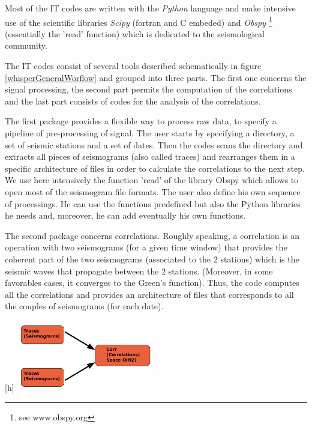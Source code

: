 \documentclass[a4paper, 10pt]{article}
\begin{document}
\begin{multicols}{2}
Most of the IT codes are written with the \emph{Python} language and make intensive use of the scientific libraries \emph{Scipy} (fortran and C embeded) 
and \emph{Obspy} \footnote{ see www.obspy.org} (essentially the 'read' function) which is dedicated to the seismological community. 

The IT codes consist of several tools described schematically in figure \ref{whisperGeneralWorflow} and grouped into three parts. The first one concerns the signal processing, the second part permits the computation of the correlations and the last part consists of codes for the analysis of the correlations.

The first package provides a flexible way to process raw data, to specify a pipeline of pre-processing of signal.
The user starts by specifying a directory, a set of seismic stations and a set of dates. Then the codes scans the directory
and extracts all pieces of seismograms (also called traces) and rearranges them in a specific architecture of files in order to calculate the correlations to the next step.
We use here intensively the function 'read' of the library Obspy which allows to open most of the seismogram file formats.
The user also define his own sequence of processings. He can use the functions predefined but also the Python libraries he needs and,
moreover, he can add eventually his own functions.

The second package concerns correlations. 
Roughly speaking, a correlation is an operation with two seismograms (for a given time window) that provides the coherent part of the two seismograms 
(associated to the 2 stations) which is the seismic waves that propagate between the 2 stations.
(Moreover, in some favorables cases, it converges to the Green's function). 
Thus, the code computes all the correlations and provides an architecture of files that corresponds to all the couples of seismograms (for each date). 

\begin{center}[h]
\centering
{}
\includegraphics[width=6cm]{schemaCorrelationStep.png}
\end{center}


\end{multicols}
\end{document}
